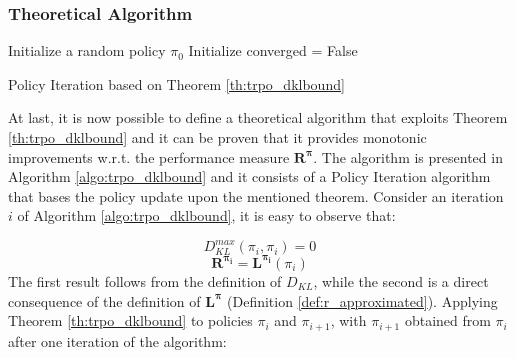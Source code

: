             \subsubsection{Theoretical Algorithm}
            \begin{algorithm}[!t]
                \SetAlgoLined
                Initialize a random policy $\pi_{0}$\;
                Initialize converged = False\;
                \caption{Policy Iteration based on Theorem \ref{th:trpo_dklbound}}
                \label{algo:trpo_dklbound}
            \end{algorithm}
                
                At last, it is now possible to define a theoretical algorithm that exploits Theorem \ref{th:trpo_dklbound} and it can be proven that it provides monotonic improvements w.r.t. the performance measure $\mathbf{R^{\pi}}$. The algorithm is presented in Algorithm \ref{algo:trpo_dklbound} and it consists of a Policy Iteration algorithm that bases the policy update upon the mentioned theorem. Consider an iteration $i$ of Algorithm \ref{algo:trpo_dklbound}, it is easy to observe that:

                \begin{equation}
                \label{eq:trpo_dklalgo_0}
                    D_{KL}^{max}(\pi_{i}, \pi_{i}) = 0
                \end{equation}
                \begin{equation} 
                    \label{eq:trpo_dklalgo_1}
                    \mathbf{R^{\pi_{i}}} = \mathbf{L^{\pi_{i}}}(\pi_{i})
                \end{equation}
                The first result follows from the definition of $D_{KL}$, while the second is a direct consequence of the definition of $\mathbf{L^{\pi}}$ (Definition \ref{def:r_approximated}). Applying Theorem \ref{th:trpo_dklbound} to policies $\pi_{i}$ and $\pi_{i+1}$, with $\pi_{i+1}$ obtained from $\pi_{i}$ after one iteration of the algorithm:
                
